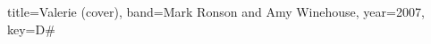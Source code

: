 \documentclass{bekki-leadsheet}
\begin{document}
\begin{song}{title={Valerie (cover)}, band={Mark Ronson and Amy Winehouse}, year={2007}, key={D#}}



\end{song}
\end{document}

